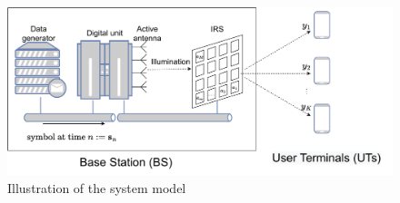 \documentclass[12pt,draftclsnofoot,onecolumn,journal]{IEEEtran}
\newcommand{\cmt}[1]{\textcolor{red}{#1} }
\begin{document}

\begin{figure}[t]\flushleft
	\includegraphics[width=6in]{sysmodel_illustration.pdf} 
	\caption{Illustration of the system model} \label{fig:sysmodel_illustration}
\end{figure}
\end{document}
